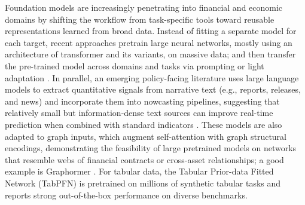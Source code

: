 Foundation models are increasingly penetrating into financial and economic domains by shifting the workflow from task-specific tools toward reusable representations learned from broad data. Instead of fitting a separate model for each target, recent approaches pretrain large neural networks, mostly using an architecture of transformer \citep{VaswaniEtAl2017Attention} and its variants, on massive data; and then transfer the pre-trained model across domains and tasks via prompting or light adaptation \citep{AnsariEtAl2024Chronos,RasulEtAl2023LagLlama,DasEtAl2024TimesFM}. In parallel, an emerging policy-facing literature uses large language models to extract quantitative signals from narrative text (e.g., reports, releases, and news) and incorporate them into nowcasting pipelines, suggesting that relatively small but information-dense text sources can improve real-time prediction when combined with standard indicators \citep{deBondtSun2025ChatGPTNowcast,KwonEtAl2024BISLLMprimer,CarrieroEtAl2024MacroLLM}. %
These models are also adapted to graph inputs, which augment self-attention with graph structural encodings, demonstrating the feasibility of large pretrained models on networks that resemble webs of financial contracts or cross-asset relationships; a good example is Graphormer \citep{Ying2021Graphormer}. For tabular data, the Tabular Prior-data Fitted Network (TabPFN) \citep{HollmannEtAl2025TabPFN} is pretrained on millions of synthetic tabular tasks and reports strong out-of-the-box performance on diverse benchmarks. %


